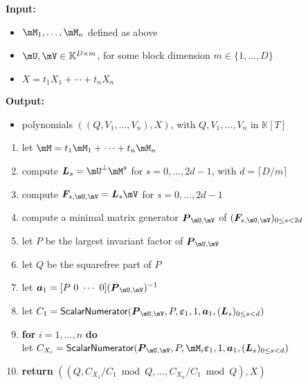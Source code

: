 \documentclass[12pt]{article}
\newcommand{\mat}[1]{\bm{\MakeUppercase{#1}}} %
\newcommand{\row}[1]{\bm{\MakeLowercase{#1}}} %
\newcommand{\col}[1]{\bm{\MakeLowercase{#1}}} %
\newcommand{\seqelt}[1]{\bm{F}_{#1}} %
\newcommand{\minpoly}{P}
\newcommand{\mainalgoname}{\mathsf{ BlockParametrization}}
\newcommand{\lf}{X}
\newcommand{\sqfree}{Q}
\def\K{\mathbb{K}}
\def\K {\ensuremath{\mathbb{K}}}
\begin{document}
\begin{algorithm}[H]
	\caption{$\mainalgoname(\mM_1,\dots,\mM_n,\mU,\mV,\lf)$}
	{\bf Input:} \vspace{-0.5em}
	\begin{itemize}
		\item $\mM_1,\dots,\mM_n$ defined as above
		\item  $\mU,\mV \in \mathbb{K}^{D \times m}$, for some block dimension  $m \in \{1,\dots,D\}$
                \item $\lf =t_1 X_1 + \cdots + t_n X_n$
	\end{itemize}
	{\bf Output:}  \vspace{-0.5em}
        \begin{itemize}
        \item         polynomials $((\sqfree,V_1,\dots,V_n),\lf)$, with $\sqfree,V_1,\dots,V_n$ in $\K[T]$
        \end{itemize}
  \begin{enumerate}
  \item\label{mainstep1}   let $\mM = t_1 \mM_1 + \cdots + t_n \mM_n$
  \item\label{mainstep3} { compute $\mat{L}_s = \mU^{\perp}\mM^s$ for $s=0,\dots,2d-1$, with $d = \lceil D/m \rceil$}
  \item\label{mainstep4} { compute $\seqelt{s,\mU,\mV}= \mat{L}_s\mV$ for $s=0,\dots, 2d-1$}
  \item\label{mainstep5} { compute a minimal matrix generator $\mat{P}_{\mU,\mV}$ of $(\seqelt{s,\mU,\mV})_{0 \le s < 2d}$}
  \item\label{mainstep6} { let $\minpoly$ be the largest invariant factor of $\mat{P}_{\mU,\mV}$}
  \item\label{mainstep7} { let $\sqfree$ be  the squarefree part  of $\minpoly$}
  \item\label{mainstep8} { let $\row{a}_1 = [P~0 ~\cdots~ 0] (\mat{P}_{\mU,\mV})^{-1}$}
  \item\label{mainstep9}  let $C_1 = \mathsf{{\sf ScalarNumerator}}(\mat{P}_{\mU,\mV}, \minpoly, \col{\varepsilon}_1, 1, \row{a}_1, 
    (\mat{L}_s)_{0 \le s < d})$
  \item\label{mainstep10} \textbf{for} $i=1,\dots,n$ \textbf{do} \\
    \phantom{for}  let $C_{X_i} = \mathsf{{\sf ScalarNumerator}}(\mat{P}_{\mU,\mV}, \minpoly, \mM_i\col{\varepsilon}_1, 1, \row{a}_1, (\mat{L}_s)_{0 \le s < d})$
\item\label{mainstep11}     \textbf{return} $((\sqfree, C_{X_1}/ C_1 \bmod \sqfree, \dots, C_{X_n}/ C_{1} \bmod \sqfree),\lf)$
  \end{enumerate}  \label{algo:block-sparse-fglm}
\end{algorithm}
\end{document}
